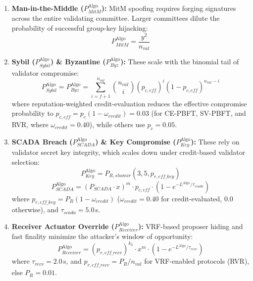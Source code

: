 \documentclass[10pt,twocolumn,journal]{IEEEtran}
\begin{document}
\begin{enumerate}[leftmargin=*]
    \item \textbf{Man-in-the-Middle ($P_{MitM}^{\text{Algo}}$):} MitM spoofing requires forging signatures across the entire validating committee. Larger committees dilute the probability of successful group-key hijacking:
    \begin{equation}
    P_{MitM}^{\text{Algo}} = \frac{y^2}{n_{val}}
    \end{equation}
    
    \item \textbf{Sybil ($P_{Sybil}^{\text{Algo}}$) \& Byzantine ($P_{Byz}^{\text{Algo}}$):} These scale with the binomial tail of validator compromise:
    \begin{equation}
    P_{Sybil}^{\text{Algo}} = P_{Byz}^{\text{Algo}} = \sum_{i=f+1}^{n_{val}} \binom{n_{val}}{i} (p_{c,eff})^i (1 - p_{c,eff})^{n_{val}-i}
    \end{equation}
    where reputation-weighted credit-evaluation reduces the effective compromise probability to $p_{c,eff} = p_c(1 - \omega_{credit}) = 0.03$ (for CE-PBFT, SV-PBFT, and RVR, where $\omega_{credit}=0.40$), while others use $p_c = 0.05$.
    
    \item \textbf{SCADA Breach ($P_{SCADA}^{\text{Algo}}$) \& Key Compromise ($P_{Key}^{\text{Algo}}$):} These rely on validator secret key integrity, which scales down under credit-based validator selection:
    \begin{equation}
    P_{Key}^{\text{Algo}} = P_{R,shamir}(3, 5, p_{r,eff\_key})
    \end{equation}
    \begin{equation}
    P_{SCADA}^{\text{Algo}} = (P_{SCADA} \cdot x)^m \cdot p_{c,eff} \cdot \left(1 - e^{-L^{\text{Algo}} / \tau_{scada}}\right)
    \end{equation}
    where $p_{r,eff\_key} = P_R(1 - \omega_{credit})$ ($\omega_{credit}=0.40$ for credit-evaluated, $0.0$ otherwise), and $\tau_{scada}=5.0$\,s.
    
    \item \textbf{Receiver Actuator Override ($P_{Receiver}^{\text{Algo}}$):} VRF-based proposer hiding and fast finality minimize the attacker's window of opportunity:
    \begin{equation}
    P_{Receiver}^{\text{Algo}} = (p_{r,eff\_recv})^{k_2} \cdot x^m \cdot \left(1 - e^{-L^{\text{Algo}} / \tau_{recv}}\right)
    \end{equation}
    where $\tau_{recv}=2.0$\,s, and $p_{r,eff\_recv} = P_R / n_{val}$ for VRF-enabled protocols (RVR), else $P_R = 0.01$.
\end{enumerate}
\end{document}
